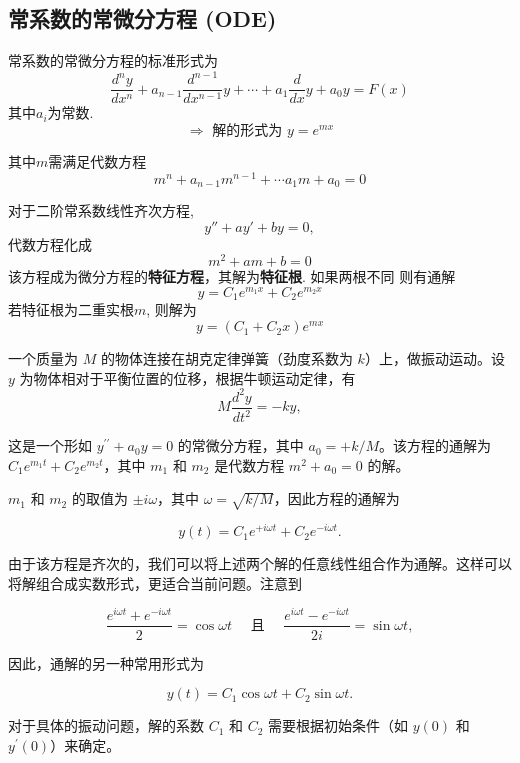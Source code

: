 \subsection{ 常系数的常微分方程 (ODE)}
常系数的常微分方程的标准形式为
\begin{equation}
\frac{d^n y}{d x^n}+a_{n-1}\frac{d^{n-1} }{d x^{n-1}} y  + \cdots +a_{1} \frac{d}{d x} y+a_0 y=F(x)
\end{equation}
其中$a_i$为常数.
$$
\Rightarrow \text { 解的形式为 } y=e^{m x}
$$

其中$m$需满足代数方程
$$
m^n+a_{n-1} m^{n-1}+\cdots a_1 m+a_0=0
$$

对于二阶常系数线性齐次方程, $$
y'' + a y' + by = 0,
$$
代数方程化成
\begin{equation}
    m^2 + a m + b = 0
\end{equation}
该方程成为微分方程的\textbf{特征方程}，其解为\textbf{特征根}. 如果两根不同
则有通解
\begin{equation}
    y = C_1 e^{m_1 x} +  C_2 e^{m_2 x} 
\end{equation}
若特征根为二重实根$m$, 则解为 
\begin{equation}
    y = (C_1 + C_2  x) e^{m x}
\end{equation}
\begin{example}
一个质量为 $M$ 的物体连接在胡克定律弹簧（劲度系数为 $k$）上，做振动运动。设 $y$ 为物体相对于平衡位置的位移，根据牛顿运动定律，有
$$
M \frac{d^2 y}{d t^2}=-k y,
$$
\end{example}

\begin{solution}
    这是一个形如 $y^{\prime \prime}+a_0 y=0$ 的常微分方程，其中 $a_0=+k / M$。该方程的通解为 $C_1 e^{m_1 t}+C_2 e^{m_2 t}$，其中 $m_1$ 和 $m_2$ 是代数方程 $m^2+a_0=0$ 的解。

    $m_1$ 和 $m_2$ 的取值为 $\pm i \omega$，其中 $\omega=\sqrt{k / M}$，因此方程的通解为

    $$
    y(t)=C_1 e^{+i \omega t}+C_2 e^{-i \omega t} .
    $$

    由于该方程是齐次的，我们可以将上述两个解的任意线性组合作为通解。这样可以将解组合成实数形式，更适合当前问题。注意到

    $$
    \frac{e^{i \omega t}+e^{-i \omega t}}{2}=\cos \omega t \quad \text { 且 } \quad \frac{e^{i \omega t}-e^{-i \omega t}}{2 i}=\sin \omega t,
    $$

    因此，通解的另一种常用形式为

    $$
    y(t)=C_1 \cos \omega t+C_2 \sin \omega t .
    $$

    对于具体的振动问题，解的系数 $C_1$ 和 $C_2$ 需要根据初始条件（如 $y(0)$ 和 $y^{\prime}(0)$）来确定。
\end{solution}

